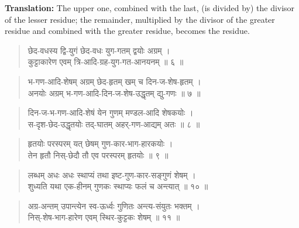 \documentclass[11pt,a4paper]{article}
\newenvironment{shloka}{\begin{verse}\devanagarifont\large}{\end{verse}}
\begin{document}
\textbf{Translation:}\quad
The upper one, combined with the last, (is divided by) the divisor of
the lesser residue; the remainder, multiplied by the divisor of the
greater residue and combined with the greater residue, becomes the
residue.

\vspace{0.3cm}

\begin{shloka}
छेद-वधस्य द्वि-युगं छेद-वधः युग-गतम् द्वयोः अग्रम् ।\\
कुट्टाकारेण एवम् त्रि-आदि-ग्रह-युग-गत-आनयनम् ॥ ६ ॥
\end{shloka}

\vspace{0.3cm}

\begin{shloka}
भ-गण-आदि-शेषम् अग्रम् छेद-हृतम् खम् च दिन-ज-शेष-हृतम् ।\\
अनयोः अग्रम् भ-गण-आदि-दिन-ज-शेष-उद्धृतम् द्यु-गणः ॥ ७ ॥
\end{shloka}

\vspace{0.3cm}

\begin{shloka}
दिन-ज-भ-गण-आदि-शेषं येन गुणम् मण्डल-आदि शेषकयोः ।\\
स-दृश-छेद-उद्धृतयोः तद्-घातम् अहर्-गण-आद्यम् अतः ॥ ८ ॥
\end{shloka}

\vspace{0.3cm}

\begin{shloka}
हृतयोः परस्परम् यत् छेषम् गुण-कार-भाग-हारकयोः ।\\
तेन हृतौ निस्-छेदौ तौ एव परस्परम् हृतयोः ॥ ९ ॥
\end{shloka}

\vspace{0.3cm}

\begin{shloka}
लब्धम् अधः अधः स्थाप्यं तथा इष्ट-गुण-कार-सङ्गुणं शेषम् ।\\
शुध्यति यथा एक-हीनम् गुणकः स्थाप्यः फलं च अन्त्यात् ॥ १० ॥
\end{shloka}

\vspace{0.3cm}

\begin{shloka}
अग्र-अन्तम् उपान्त्येन स्व-ऊर्ध्वः गुणितः अन्त्य-संयुतः भक्तम् ।\\
निस्-शेष-भाग-हारेण एवम् स्थिर-कुट्टकः शेषम् ॥ ११ ॥
\end{shloka}
\end{document}
